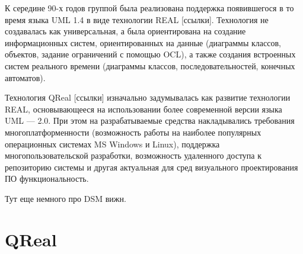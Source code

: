 \documentclass[a5paper]{article}
\begin{document}
К середине 90-х годов группой была реализована поддержка появившегося в то время языка UML 1.4 в виде технологии REAL [ссылки]. Технология не создавалась как универсальная, а была ориентирована на создание информационных систем, ориентированных на данные (диаграммы классов, объектов, задание ограничений с помощью OCL), а также создания встроенных систем реального времени (диаграммы классов, последовательностей, конечных автоматов). 

Технология QReal [ссылки] изначально задумывалась как развитие технологии REAL, основывающееся на использовании более современной версии языка UML --- 2.0. При этом на разрабатываемые средства накладывались требования многоплатформенности (возможность работы на наиболее популярных операционных системах MS Windows и Linux), поддержка многопользовательской разработки, возможность удаленного доступа к репозиторию системы и другая актуальная для сред визуального проектирования ПО функциональность.

Тут еще немного про DSM вижн.

\section{QReal}
\end{document}
